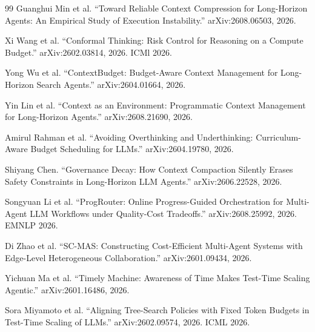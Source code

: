\begin{thebibliography}{99}
Guanghui Min et al.
``Toward Reliable Context Compression for Long-Horizon Agents: An Empirical Study of Execution Instability.''
arXiv:2608.06503, 2026.

Xi Wang et al.
``Conformal Thinking: Risk Control for Reasoning on a Compute Budget.''
arXiv:2602.03814, 2026. ICMl 2026.

Yong Wu et al.
``ContextBudget: Budget-Aware Context Management for Long-Horizon Search Agents.''
arXiv:2604.01664, 2026.

Yin Lin et al.
``Context as an Environment: Programmatic Context Management for Long-Horizon Agents.''
arXiv:2608.21690, 2026.

Amirul Rahman et al.
``Avoiding Overthinking and Underthinking: Curriculum-Aware Budget Scheduling for LLMs.''
arXiv:2604.19780, 2026.

Shiyang Chen.
``Governance Decay: How Context Compaction Silently Erases Safety Constraints in Long-Horizon LLM Agents.''
arXiv:2606.22528, 2026.

Songyuan Li et al.
``ProgRouter: Online Progress-Guided Orchestration for Multi-Agent LLM Workflows under Quality-Cost Tradeoffs.''
arXiv:2608.25992, 2026. EMNLP 2026.

Di Zhao et al.
``SC-MAS: Constructing Cost-Efficient Multi-Agent Systems with Edge-Level Heterogeneous Collaboration.''
arXiv:2601.09434, 2026.

Yichuan Ma et al.
``Timely Machine: Awareness of Time Makes Test-Time Scaling Agentic.''
arXiv:2601.16486, 2026.

Sora Miyamoto et al.
``Aligning Tree-Search Policies with Fixed Token Budgets in Test-Time Scaling of LLMs.''
arXiv:2602.09574, 2026. ICML 2026.
\end{thebibliography}
